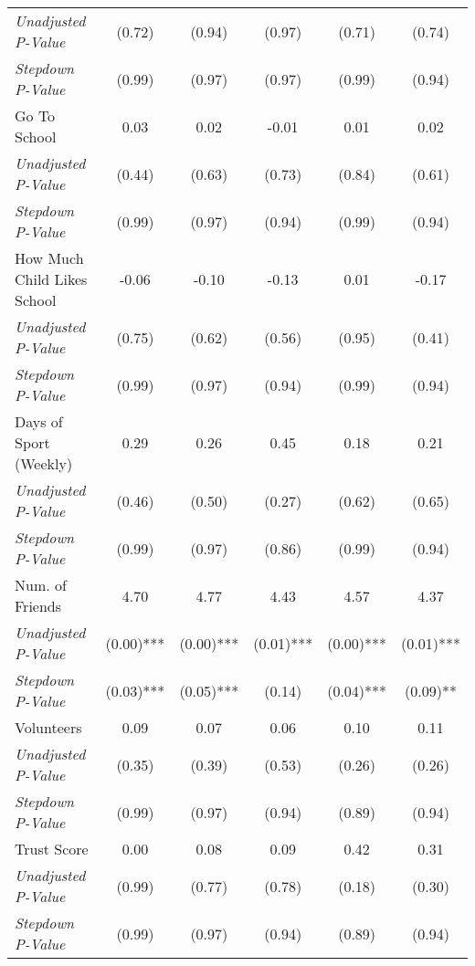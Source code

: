 \begin{tabular}{l c c c c c}
\quad \textit{Unadjusted P-Value} & (0.72) & (0.94) & (0.97) & (0.71) & (0.74) \\
\quad \textit{Stepdown P-Value} & (0.99) & (0.97) & (0.97) & (0.99) & (0.94) \\
Go To School & 0.03 & 0.02 & -0.01 & 0.01 & 0.02 \\
\quad \textit{Unadjusted P-Value} & (0.44) & (0.63) & (0.73) & (0.84) & (0.61) \\
\quad \textit{Stepdown P-Value} & (0.99) & (0.97) & (0.94) & (0.99) & (0.94) \\
How Much Child Likes School & -0.06 & -0.10 & -0.13 & 0.01 & -0.17 \\
\quad \textit{Unadjusted P-Value} & (0.75) & (0.62) & (0.56) & (0.95) & (0.41) \\
\quad \textit{Stepdown P-Value} & (0.99) & (0.97) & (0.94) & (0.99) & (0.94) \\
Days of Sport (Weekly) & 0.29 & 0.26 & 0.45 & 0.18 & 0.21 \\
\quad \textit{Unadjusted P-Value} & (0.46) & (0.50) & (0.27) & (0.62) & (0.65) \\
\quad \textit{Stepdown P-Value} & (0.99) & (0.97) & (0.86) & (0.99) & (0.94) \\
Num. of Friends & 4.70 & 4.77 & 4.43 & 4.57 & 4.37 \\
\quad \textit{Unadjusted P-Value} & (0.00)*** & (0.00)*** & (0.01)*** & (0.00)*** & (0.01)*** \\
\quad \textit{Stepdown P-Value} & (0.03)*** & (0.05)*** & (0.14) & (0.04)*** & (0.09)** \\
Volunteers & 0.09 & 0.07 & 0.06 & 0.10 & 0.11 \\
\quad \textit{Unadjusted P-Value} & (0.35) & (0.39) & (0.53) & (0.26) & (0.26) \\
\quad \textit{Stepdown P-Value} & (0.99) & (0.97) & (0.94) & (0.89) & (0.94) \\
Trust Score & 0.00 & 0.08 & 0.09 & 0.42 & 0.31 \\
\quad \textit{Unadjusted P-Value} & (0.99) & (0.77) & (0.78) & (0.18) & (0.30) \\
\quad \textit{Stepdown P-Value} & (0.99) & (0.97) & (0.94) & (0.89) & (0.94) \\
\bottomrule
\end{tabular}
